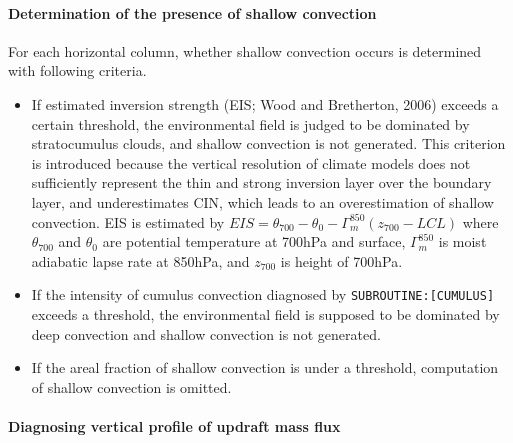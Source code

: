 \paragraph{Determination of the presence of shallow convection}\label{presence-of-shallow-convection}

For each horizontal column, whether shallow convection occurs is determined with following criteria.
\begin{itemize}
    \item If estimated inversion strength (EIS; Wood and Bretherton, 2006) exceeds a certain threshold,
    the environmental field is judged to be dominated by stratocumulus clouds, and shallow convection is not generated.
    This criterion is introduced because the vertical resolution of climate models does not sufficiently represent the thin and strong inversion layer over the boundary layer,
    and underestimates CIN, which leads to an overestimation of shallow convection.
    EIS is estimated by
     $EIS=\theta_{700}-\theta_{0}-\Gamma_m^{850}(z_{700}-LCL)$
    where $\theta_{700}$ and $\theta_0$ are potential temperature at 700hPa and surface, $\Gamma_m^{850}$ is moist adiabatic lapse rate at 850hPa,
    and $z_{700}$ is height of 700hPa.
    \item If the intensity of cumulus convection diagnosed by \texttt{SUBROUTINE:[CUMULUS]} exceeds a threshold, the environmental
    field is supposed to be dominated by deep convection and shallow convection is not generated.
    \item If the areal fraction of shallow convection is under a threshold, computation of shallow convection is omitted.
 \end{itemize}

\paragraph{Diagnosing vertical profile of updraft mass flux}\label{diagnosing-vertical-profile-of-updraft-mass-flux}

